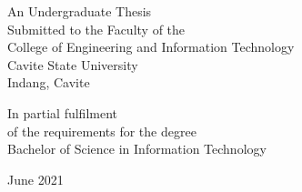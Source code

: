 
\begin{singlespace}
	\begin{titlepage}
		\begin{center}
			\textbf{\thesistitle{}}

			\vfill
			\center
			An Undergraduate Thesis\\
			Submitted to the Faculty of the\\
			College of Engineering and Information Technology\\
			Cavite State University\\
			Indang, Cavite

			\vfill
			\center
			In partial fulfilment\\
			of the requirements for the degree\\
			Bachelor of Science in Information Technology

			\vfill
			\thesisautors{}
			{June 2021}

		\end{center}
	\end{titlepage}
\end{singlespace}
